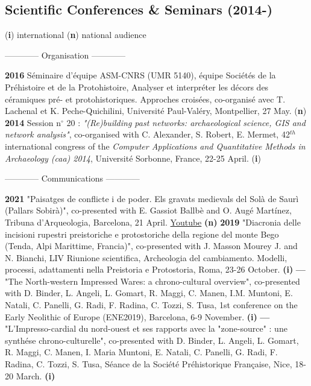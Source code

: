 \documentclass{article}
\begin{document}
\subsection*{Scientific Conferences \& Seminars (2014-)}
\begin{center}(\textbf{i}) international {\textbar} (\textbf{n}) national audience \end{center}
\smallbreak
\begin{center}------------ Organisation ------------\end{center}
\smallbreak
\textbf{2016 }S\'{e}minaire d'\'{e}quipe ASM-CNRS (UMR 5140), \'{e}quipe Soci\'{e}t\'{e}s de la Pr\'{e}histoire et de la Protohistoire, Analyser et interpr\'{e}ter les d\'{e}cors des c\'{e}ramiques pr\'{e}- et protohistoriques. Approches crois\'{e}es, co-organis\'{e} avec T. Lachenal et K. Peche-Quichilini, Universit\'{e} Paul-Val\'{e}ry, Montpellier, 27 May. (\textbf{n})
\smallbreak
\textbf{2014 }Session n$\mathrm{{}^\circ}$ 20 :\textit{ "(Re)building past networks: archaeological science, GIS and network analysis"}, co-organised with C. Alexander, S. Robert, E. Mermet, 42${}^{th}$ international congress of the \textit{Computer Applications and Quantitative Methods in Archaeology (caa) 2014}, Universit\'{e} Sorbonne, France, 22-25 April. (\textbf{i})
\bigbreak
\begin{center}------------ Communications ------------\end{center}
\smallbreak
\textbf{2021 }"Paisatges de conflicte i de poder. Els gravats medievals del Sol\`{a} de Saur\`{i} (Pallars Sobir\`{a})", co-presented with E. Gassiot Ballb\`{e} and O. Aug\'{e} Mart\'{i}nez, Tribuna d'Arqueologia, Barcelona, 21 April. \href{https://www.youtube.com/watch?v=4b7gLw4NV_E}{Youtube} \textbf{(n)}
\smallbreak
\textbf{2019 }"Diacronia delle incisioni rupestri preistoriche e protostoriche della regione del monte Bego (Tenda, Alpi Marittime, Francia)", co-presented with J. Masson Mourey J. and N. Bianchi, LIV Riunione scientifica, Archeologia del cambiamento. Modelli, processi, adattamenti nella Preistoria e Protostoria, Roma, 23-26 October. \textbf{(i)}
\smallbreak
\textbf{---  }"The North-western Impressed Wares: a chrono-cultural overview", co-presented with D. Binder, L. Angeli, L. Gomart, R. Maggi, C. Manen, I.M. Muntoni, E. Natali, C. Panelli, G. Radi, F. Radina, C. Tozzi, S. Tusa, 1st conference on the Early Neolithic of Europe (ENE2019), Barcelona, 6-9 November. \textbf{(i)}
\smallbreak
\textbf{---  }"L'Impresso-cardial du nord-ouest et ses rapports avec la "zone-source" : une synth\'{e}se chrono-culturelle", co-presented with D. Binder, L. Angeli, L. Gomart, R. Maggi, C. Manen, I. Maria Muntoni, E. Natali, C. Panelli, G. Radi, F. Radina, C. Tozzi, S. Tusa, S\'{e}ance de la Soci\'{e}t\'{e} Pr\'{e}historique Fran\c{c}aise, Nice, 18-20 March.\textbf{ (i)}
\end{document}

